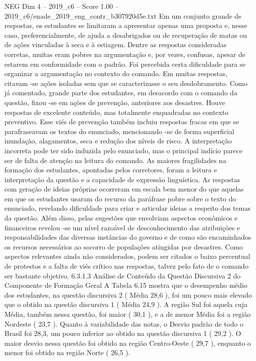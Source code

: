 \begin{textsample}{NEG Dim 4 – 2019\_c6 – Score 1.00 – 2019\_c6/enade\_2019\_eng\_contr\_b307920d5e.txt}
Em um conjunto grande de respostas, os estudantes se limitaram a apresentar apenas uma proposta e, nesse caso, preferencialmente, de ajuda a desabrigados ou de recuperação de matas ou de ações vinculadas à seca e à estiagem.
Dentre as respostas consideradas corretas, muitas eram pobres na argumentação e, por vezes, confusas, apesar de estarem em conformidade com o padrão.
Foi percebida certa dificuldade para se organizar a argumentação no contexto do comando.
Em muitas respostas, citavam -se ações isoladas sem que se caracterizasse o seu desdobramento.
Como já comentado, grande parte dos estudantes, em desacordo com o comando da questão, fixou -se em ações de prevenção, anteriores aos desastres.
Houve respostas de excelente conteúdo, mas totalmente enquadradas no contexto preventivo.
Esse viés de prevenção também incluiu respostas fracas em que se parafraseavam os textos do enunciado, mencionando -se de forma superficial inundação, alagamentos, seca e redução dos níveis de risco.
A interpretação incorreta pode ter sido induzida pelo enunciado, mas o principal indício parece ser de falta de atenção na leitura do comando.
As maiores fragilidades na formação dos estudantes, apontadas pelos corretores, foram a leitura e interpretação da questão e a capacidade de expressão linguística.
As respostas com geração de ideias próprias ocorreram em escala bem menor do que aquelas em que os estudantes usaram do recurso da paráfrase pobre sobre o texto do enunciado, revelando dificuldade para criar e articular ideias a respeito dos temas da questão.
Além disso, pelas sugestões que envolviam aspectos econômicos e financeiros revelou -se um nível razoável de desconhecimento das atribuições e responsabilidades das diversas instâncias do governo e de como são encaminhados os recursos necessários ao socorro de populações atingidas por desastres.
Como aspectos relevantes ainda não considerados, podem ser citados o baixo percentual de protestos e a falta de viés crítico nas respostas, talvez pelo fato de o comando ser bastante objetivo. 6.3.1.3 Análise de Conteúdo da Questão Discursiva 2 do Componente de Formação Geral A Tabela 6.15 mostra que o desempenho médio dos estudantes, na questão discursiva 2 ( Média 28,6 ), foi um pouco mais elevado que o obtido na questão discursiva 1 ( Média 24,9 ).
A região Sul foi aquela cuja Média, também nessa questão, foi maior ( 30,1 ), e a de menor Média foi a região Nordeste ( 23,7 ).
Quanto à variabilidade das notas, o Desvio padrão de todo o Brasil foi 28,3, um pouco inferior ao obtido na questão discursiva 1 ( 29,2 ).
O maior desvio nessa questão foi obtido na região Centro-Oeste ( 29,7 ), enquanto o menor foi obtido na região Norte ( 26,5 ).

\end{textsample}
